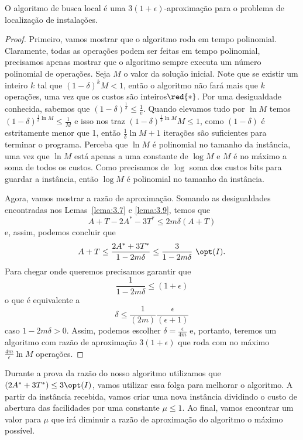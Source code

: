\begin{theorem}
    O algoritmo de busca local é uma $3(1+\epsilon)$-aproximação para o problema de localização de instalações.
\end{theorem}
\begin{proof}
    Primeiro, vamos mostrar que o algoritmo roda em tempo polinomial. Claramente, todas as operações podem ser feitas em tempo polinomial, precisamos apenas mostrar que o algoritmo sempre executa um número polinomial de operações.
    Seja $M$ o valor da solução inicial. Note que se existir um inteiro $k$ tal que $(1-\delta)^kM < 1$, então o algoritmo não fará mais que $k$ operações, uma vez que os custos são inteiros$\red{*}$. Por uma desigualdade conhecida, sabemos que $(1 - \delta)^{\frac{1}{\delta}} \leq \frac{1}{e}$. Quando elevamos tudo por $\ln M$ temos $(1- \delta)^{\frac{1}{\delta}\ln M} \leq \frac{1}{M}$ e isso nos traz $ (1- \delta)^{\frac{1}{\delta}\ln M}M \leq 1$, como $(1-\delta)$ é estritamente menor que 1, então $\frac{1}{\delta}\ln M + 1$ iterações são suficientes para terminar o programa. Perceba que $\ln M$ é polinomial no tamanho da instância, uma vez que $\ln M$ está apenas a uma constante de $\log M$ e $M$ é no máximo a soma de todos os custos. Como precisamos de $\log$ soma dos custos bits para guardar a instância, então $\log M$ é polinomial no tamanho da instância.

    Agora, vamos mostrar a razão de aproximação. Somando as desigualdades encontradas nos Lemas~\ref{lema:3.7} e \ref{lema:3.9}, temos que 
        \[A + T - 2A^* - 3T^* \leq 2m\delta(A+T)\] 
        e, assim, podemos concluir que
        \[A+T \leq \frac{2A^* + 3T^*}{1-2m\delta} \leq \frac{3}{1-2m\delta} \ \opt(I).\]
    Para chegar onde queremos precisamos garantir que \[\frac{1}{1-2m\delta}\leq (1+\epsilon)\]
    o que é equivalente a 
    \[\delta \leq \frac{1}{(2m)} \frac{\epsilon}{(\epsilon+1)}\]
    caso $ 1 - 2m\delta >0$.
    Assim, podemos escolher $\delta = \frac{\epsilon}{4m}$ e, portanto, teremos um algoritmo com razão de aproximação $3(1+\epsilon)$ que roda com no máximo $\frac{4m}{\epsilon}\ln M$ operações.
\end{proof}
Durante a prova da razão do nosso algoritmo utilizamos que $(2A^* + 3T^*) \leq 3\opt(I)$, vamos utilizar essa folga para melhorar o algoritmo. 
A partir da instância recebida, vamos criar uma nova instância dividindo o custo de abertura das facilidades por uma constante $\mu \leq 1$. Ao final, vamos encontrar um valor para $\mu$ que irá diminuir a razão de aproximação do algoritmo o máximo possível. \\
